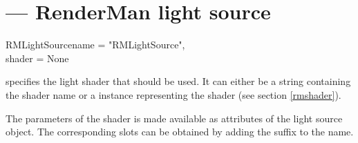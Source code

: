 
\section{ ---
         RenderMan light source}

\begin{classdesc}{RMLightSource}{name = "RMLightSource",\\ 
                       shader = None
                  }


 specifies the light shader that should be used. It
can either be a string containing the shader name or a 
instance representing the shader (see section \ref{rmshader}).

\end{classdesc}


The parameters of the shader is made available as attributes of the
light source object. The corresponding slots can be obtained by adding
the suffix  to the name.

